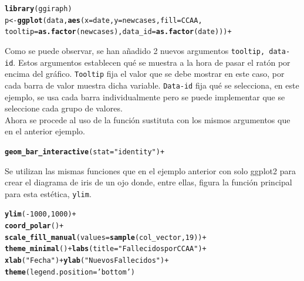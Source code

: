 \documentclass{article}\usepackage[]{graphicx}\usepackage[]{color}
\makeatletter
\newcommand{\hlnum}[1]{\textcolor[rgb]{0.686,0.059,0.569}{#1}}%
\newcommand{\hlstr}[1]{\textcolor[rgb]{0.192,0.494,0.8}{#1}}%
\newcommand{\hlopt}[1]{\textcolor[rgb]{0,0,0}{#1}}%
\newcommand{\hlstd}[1]{\textcolor[rgb]{0.345,0.345,0.345}{#1}}%
\newcommand{\hlkwc}[1]{\textcolor[rgb]{0.333,0.667,0.333}{#1}}%
\newcommand{\hlkwd}[1]{\textcolor[rgb]{0.737,0.353,0.396}{\textbf{#1}}}%
\newenvironment{kframe}{%
 \def\at@end@of@kframe{}%
 \ifinner\ifhmode%
  \def\at@end@of@kframe{\end{minipage}}%
  \begin{minipage}{\columnwidth}%
 \fi\fi%
 \def\FrameCommand##1{\hskip\@totalleftmargin \hskip-\fboxsep
 \colorbox{shadecolor}{##1}\hskip-\fboxsep
     \hskip-\linewidth \hskip-\@totalleftmargin \hskip\columnwidth}%
 \MakeFramed {\advance\hsize-\width
   \@totalleftmargin\z@ \linewidth\hsize
   \@setminipage}}%
 {\par\unskip\endMakeFramed%
 \at@end@of@kframe}
\newenvironment{knitrout}{}{} %
\makeatother
\begin{document}
\begin{knitrout}
\color{fgcolor}\begin{kframe}
\begin{alltt}
\hlkwd{library}(ggiraph)
p <- \hlkwd{ggplot}(data, \hlkwd{aes}(x=date, y= newcases, fill = CCAA, 
        tooltip= \hlkwd{as.factor}(newcases), data_id =\hlkwd{as.factor}(date))) +
\end{alltt}
\end{kframe}
\end{knitrout}
Como se puede observar, se han a\~nadido 2 nuevos argumentos \texttt{tooltip, data-id}. Estos argumentos establecen qu\'e se muestra a la hora de pasar el rat\'on por encima del gr\'afico. \texttt{Tooltip} fija el valor que se debe mostrar en este caso, por cada barra de valor muestra dicha variable. \texttt{Data-id} fija qu\'e se selecciona, en este ejemplo, se usa cada barra individualmente pero se puede implementar que se seleccione cada grupo de valores.~\\
Ahora se procede al uso de la funci\'on sustituta con los mismos argumentos que en el anterior ejemplo.
\begin{knitrout}
\color{fgcolor}\begin{kframe}
\begin{alltt}
        \hlkwd{geom_bar_interactive}(stat=\hlstr{"identity"}) +
\end{alltt}
\end{kframe}
\end{knitrout}
Se utilizan las mismas funciones que en el ejemplo anterior con solo ggplot2 para crear el diagrama de iris de un ojo donde, entre ellas, figura la funci\'on principal para esta est\'etica, \texttt{ylim}.
\begin{knitrout}
\color{fgcolor}\begin{kframe}
\begin{alltt}
        \hlkwd{ylim}\hlstd{(}\hlopt{-}\hlnum{1000}\hlstd{,}\hlnum{1000}\hlstd{)} \hlopt{+}
        \hlkwd{coord_polar}\hlstd{()} \hlopt{+}
        \hlkwd{scale_fill_manual}\hlstd{(}\hlkwc{values} \hlstd{=} \hlkwd{sample}\hlstd{(col_vector,} \hlnum{19}\hlstd{))} \hlopt{+}
        \hlkwd{theme_minimal}\hlstd{()}\hlopt{+}\hlkwd{labs}\hlstd{(}\hlkwc{title} \hlstd{=} \hlstr{"Fallecidos por CCAA"}\hlstd{)} \hlopt{+}
        \hlkwd{xlab}\hlstd{(}\hlstr{"Fecha"}\hlstd{)}\hlopt{+}\hlkwd{ylab}\hlstd{(}\hlstr{"Nuevos Fallecidos"}\hlstd{)}\hlopt{+}
        \hlkwd{theme}\hlstd{(}\hlkwc{legend.position} \hlstd{=} \hlstr{'bottom'}\hlstd{)}
\end{alltt}
\end{kframe}
\end{knitrout}
\end{document}
